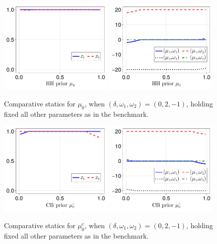 \documentclass[12pt,a4paper]{article}
\begin{document}
\begin{figure}[H]
\centering
\includegraphics[width=0.49\textwidth]{figures/V8/γ_10/fig_optimal_π_across_μ_0_ω_1_2_ω_2_-1_δ_0.0_.pdf}
\includegraphics[width=0.49\textwidth]{figures/V8/γ_10/fig_posterior_across_μ_0_ω_1_2_ω_2_-1_δ_0.0_.pdf}
\caption{Comparative statics for $\mu_0$, when $(\delta,\omega_1,\omega_2)=(0,2,-1)$, holding fixed all other parameters as in the benchmark.}
\label{FigureA11}
\end{figure}

\begin{figure}[H]
\centering
\includegraphics[width=0.49\textwidth]{figures/V8/γ_10/fig_optimal_π_across_μ_0_c_ω_1_2_ω_2_-1_δ_0.0_.pdf}
\includegraphics[width=0.49\textwidth]{figures/V8/γ_10/fig_posterior_across_μ_0_c_ω_1_2_ω_2_-1_δ_0.0_.pdf}
\caption{Comparative statics for $\mu_0^c$, when $(\delta,\omega_1,\omega_2)=(0,2,-1)$, holding fixed all other parameters as in the benchmark.}
\label{FigureA12}
\end{figure}
\end{document}
